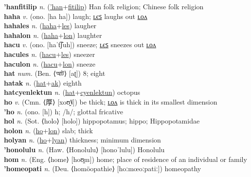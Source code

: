 \textbf{'hanfitilip} \textit{n.} (\hyperref['han]{'han}+\hyperref[fitilip]{fitilip})
Han folk religion; Chinese folk religion \label{'hanfitilip} \\
\textbf{haha} \textit{v.} (ono. [ha ha])
laugh; \hyperref[hahales]{ʟєꜱ} laughs out \hyperref[hahalon]{ʟᴏᴧ} \label{haha} \\
\textbf{hahales} \textit{n.} (\hyperref[haha]{haha}+\hyperref[les]{les})
laugher \label{hahales} \\
\textbf{hahalon} \textit{n.} (\hyperref[haha]{haha}+\hyperref[lon]{lon})
laughter \label{hahalon} \\
\textbf{hacu} \textit{v.} (ono. [haˈt͡ʃuh])
sneeze; \hyperref[hacules]{ʟєꜱ} sneezes out \hyperref[haculon]{ʟᴏᴧ} \label{hacu} \\
\textbf{hacules} \textit{n.} (\hyperref[hacu]{hacu}+\hyperref[les]{les})
sneezer \label{hacules} \\
\textbf{haculon} \textit{n.} (\hyperref[hacu]{hacu}+\hyperref[lon]{lon})
sneeze \label{haculon} \\
\textbf{hat} \textit{num.} (Ben. ⟨আট⟩ [aʈ])
8; eight \label{hat} \\
\textbf{hatak} \textit{n.} (\hyperref[hat]{hat}+\hyperref[ak]{ak})
eighth \label{hatak} \\
\textbf{hatcyenlektun} \textit{n.} (\hyperref[hat]{hat}+\hyperref[cyenlektun]{cyenlektun})
octopus \label{hatcyenlektun} \\
\textbf{ho} \textit{v.} (Cmn. ⟨厚⟩ [xoʊ̯˥˩])
be thick; \hyperref[holon]{ʟᴏᴧ} is thick in its smallest dimension \label{ho} \\
\textbf{'ho} \textit{n.} (ono. [h])
h; /h/; glottal fricative \label{'ho} \\
\textbf{hol} \textit{n.} (Sot. ⟨holo⟩ [holo])
hippopotamus; hippo; Hippopotamidae \label{hol} \\
\textbf{holon} \textit{n.} (\hyperref[ho]{ho}+\hyperref[lon]{lon})
slab; thick \label{holon} \\
\textbf{holyan} \textit{n.} (\hyperref[ho]{ho}+\hyperref[lyan]{lyan})
thickness; minimum dimension \label{holyan} \\
\textbf{'honolulu} \textit{n.} (Haw. ⟨Honolulu⟩ [honoˈlulu])
Honolulu \label{'honolulu} \\
\textbf{hom} \textit{n.} (Eng. ⟨home⟩ [hoʊ̯m])
home; place of residence of an individual or family \label{hom} \\
\textbf{'homeopati} \textit{n.} (Deu. ⟨homöopathie⟩ [hoːmœoːpatiː])
homeopathy \label{'homeopati} \\

